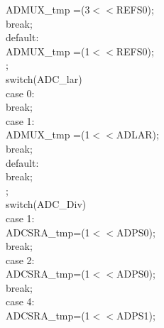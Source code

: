 \documentclass[titlepage, a4paper, 10pt, reqno, openany]{report}
\begin{document}
\begin{minipage}[t]{.3\linewidth}
	\hspace*{1.5cm}			ADMUX\_tmp \textbar =(3$<<$REFS0); \\
	\hspace*{1.5cm}			break; \\
	\hspace*{1cm}		default: \\
	\hspace*{1.5cm}			ADMUX\_tmp \textbar =(1$<<$REFS0); \\
	\hspace*{.5cm}	\textbraceright ; \\
	\hspace*{.5cm}	switch(ADC\_lar)\textbraceleft \\
	\hspace*{1cm}		case 0: \\
	\hspace*{1.5cm}			break; \\
	\hspace*{1cm}		case 1: \\
	\hspace*{1.5cm}			ADMUX\_tmp \textbar =(1$<<$ADLAR); \\
	\hspace*{1.5cm}			break; \\
	\hspace*{1cm}		default: \\
	\hspace*{1.5cm}			break; \\
	\hspace*{.5cm}	\textbraceright ; \\
	\hspace*{.5cm}	switch(ADC\_Div)\textbraceleft \\
	\hspace*{1cm}		case 1: \\
	\hspace*{1.5cm}			ADCSRA\_tmp=(1$<<$ADPS0); \\
	\hspace*{1.5cm}			break; \\
	\hspace*{1cm}		case 2: \\
	\hspace*{1.5cm}			ADCSRA\_tmp=(1$<<$ADPS0); \\
	\hspace*{1.5cm}			break; \\
	\hspace*{1cm}		case 4: \\
	\hspace*{1.5cm}			ADCSRA\_tmp=(1$<<$ADPS1); \\

\end{minipage}
\end{document}
